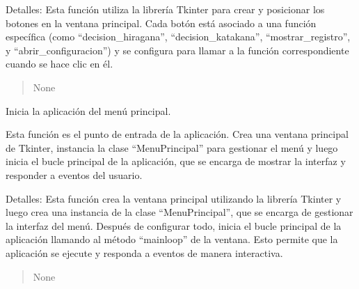 \documentclass[letterpaper,10pt,spanish]{sphinxmanual}
\begin{document}
\begin{fulllineitems}
\begin{fulllineitems}
\sphinxAtStartPar
Detalles:
Esta función utiliza la librería Tkinter para crear y posicionar los botones en la ventana principal. Cada
botón está asociado a una función específica (como “decision\_hiragana”, “decision\_katakana”, “mostrar\_registro”,
y “abrir\_configuracion”) y se configura para llamar a la función correspondiente cuando se hace clic en él.
\begin{quote}\begin{description}
\sphinxAtStartPar
None

\end{description}\end{quote}

\end{fulllineitems}


\end{fulllineitems}


\begin{fulllineitems}
\label{\detokenize{main:main.main}}
\pysigstartsignatures
{}
\pysigstopsignatures
\sphinxAtStartPar
Inicia la aplicación del menú principal.

\sphinxAtStartPar
Esta función es el punto de entrada de la aplicación. Crea una ventana principal de Tkinter, instancia la clase
“MenuPrincipal” para gestionar el menú y luego inicia el bucle principal de la aplicación, que se encarga de
mostrar la interfaz y responder a eventos del usuario.

\sphinxAtStartPar
Detalles:
Esta función crea la ventana principal utilizando la librería Tkinter y luego crea una instancia de la clase
“MenuPrincipal”, que se encarga de gestionar la interfaz del menú. Después de configurar todo, inicia el bucle
principal de la aplicación llamando al método “mainloop” de la ventana. Esto permite que la aplicación se ejecute
y responda a eventos de manera interactiva.
\begin{quote}\begin{description}
\sphinxAtStartPar
None

\end{description}\end{quote}

\end{fulllineitems}


\sphinxstepscope
\end{document}
